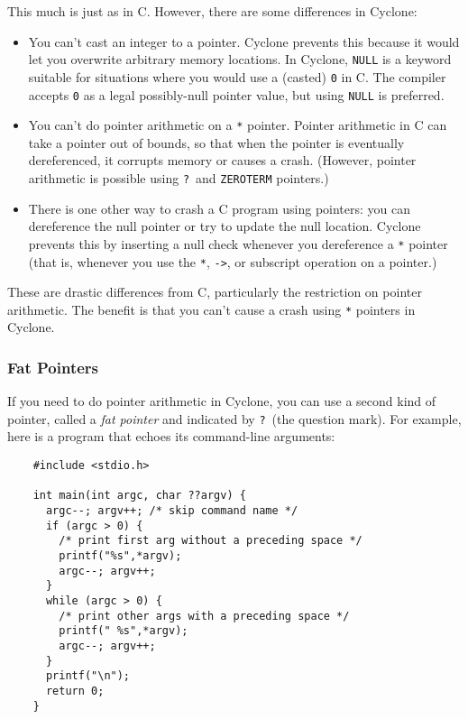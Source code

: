 This much is just as in C\@.  However, there are some differences in
Cyclone:
\begin{itemize}
\item You can't cast an integer to a pointer.  Cyclone prevents this
  because it would let you overwrite arbitrary memory locations.  In
  Cyclone, \texttt{NULL} is a keyword suitable for situations where
  you would use a (casted) \texttt{0} in C\@.  The compiler 
  accepts \texttt{0} as a legal possibly-null pointer value, but using
  \texttt{NULL} is preferred.
\item You can't do pointer arithmetic on a \texttt{*} pointer.
  Pointer arithmetic in C can take a pointer out of bounds, so that
  when the pointer is eventually dereferenced, it corrupts memory or
  causes a crash.  (However, pointer arithmetic is possible
  using \texttt{?}\ and \texttt{ZEROTERM} pointers.)
\item There is one other way to crash a C program using pointers: you
  can dereference the null pointer or try to update the null location.
  Cyclone prevents this by inserting a null check whenever you
  dereference a \texttt{*} pointer (that is, whenever you use the
  \texttt{*}, \texttt{->}, or subscript operation on a pointer.)
\end{itemize}

These are drastic differences from C, particularly the restriction on
pointer arithmetic.  The benefit is that you can't cause a crash using
\texttt{*} pointers in Cyclone.

\subsubsection*{Fat Pointers}

If you need to do pointer arithmetic in Cyclone, you can use a second
kind of pointer, called a \emph{fat pointer} and indicated by \texttt{?}\ 
(the question mark).  For
example, here is a program that echoes its command-line arguments:
\begin{verbatim}
    #include <stdio.h>

    int main(int argc, char ??argv) {
      argc--; argv++; /* skip command name */
      if (argc > 0) {
        /* print first arg without a preceding space */
        printf("%s",*argv);
        argc--; argv++;
      }
      while (argc > 0) {
        /* print other args with a preceding space */
        printf(" %s",*argv);
        argc--; argv++;
      }
      printf("\n");
      return 0;
    }
\end{verbatim}

